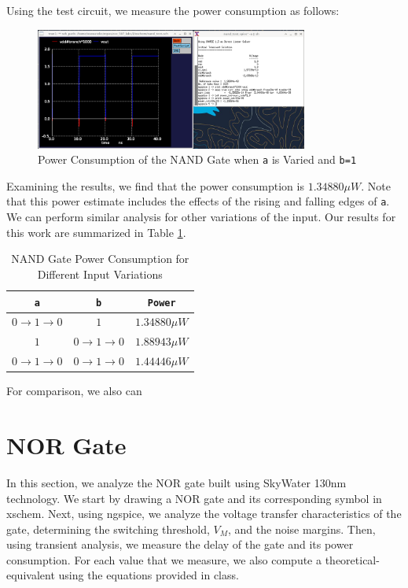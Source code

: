 \documentclass[fleqn]{article}
\begin{document}
	\noindent Using the test circuit, we measure the power consumption as follows:
	
	\begin{figure}[H]
		\centerline{\includegraphics[width=0.8\textwidth]{nand_power_sweep_va.png}}
		\caption{Power Consumption of the NAND Gate when \texttt{a} is Varied and \texttt{b=1}}
		\label{fig::nand_power_sweep_va}
	\end{figure}
	
	\noindent Examining the results, we find that the power consumption is $1.34880{\mu}W$. Note that this power estimate includes the effects of the rising and falling edges of \texttt{a}. We can perform similar analysis for other variations of the input. Our results for this work are summarized in Table \ref{table::nand_gate_power_analysis}.
	
	\begin{table}[H]
	\begin{center}
	\caption{NAND Gate Power Consumption for Different Input Variations}
	\label{table::nand_gate_power_analysis}
	\begin{tabular}{| c | c | c |}
		\hline
		\texttt{a} & \texttt{b} & \texttt{Power}\\
		\hline	
		$0 \rightarrow 1 \rightarrow 0$ & $1$ & $1.34880{\mu}W$ \\
		\hline	
		$1$ & $0 \rightarrow 1 \rightarrow 0$ & $1.88943{\mu}W$ \\
		\hline	
		$0 \rightarrow 1 \rightarrow 0$ & $0 \rightarrow 1 \rightarrow 0$ & $1.44446{\mu}W$\\
		\hline
	\end{tabular}
	\end{center}
	\end{table}
	
	For comparison, we also can 
	\section{NOR Gate}
	
	In this section, we analyze the NOR gate built using SkyWater 130nm technology. We start by drawing a NOR gate and its corresponding symbol in xschem. Next, using ngspice, we analyze the voltage transfer characteristics of the gate, determining the switching threshold, $V_M$, and the noise margins. Then, using transient analysis, we measure the delay of the gate and its power consumption. For each value that we measure, we also compute a theoretical-equivalent using the equations provided in class.
	
\end{document}
